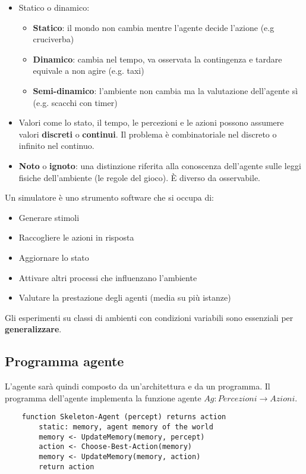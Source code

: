 \begin{itemize}
\begin{itemize}
	\end{itemize}
	\item Statico o dinamico:
	\begin{itemize}
		\item \textbf{Statico}: il mondo non cambia mentre l’agente decide l’azione (e.g cruciverba)
		\item \textbf{Dinamico}: cambia nel tempo, va osservata la contingenza e tardare equivale a non agire (e.g. taxi)
		\item \textbf{Semi-dinamico}: l’ambiente non cambia ma la valutazione dell’agente sì (e.g. scacchi con timer)
	\end{itemize}
	\item Valori come lo stato, il tempo, le percezioni e le azioni possono assumere valori \textbf{discreti} o \textbf{continui}. Il problema è combinatoriale nel discreto o infinito nel continuo.
	\item \textbf{Noto} o \textbf{ignoto}: una distinzione riferita alla conoscenza dell'agente sulle leggi fisiche dell'ambiente (le regole del gioco). È diverso da osservabile.
\end{itemize}

\begin{definition}[Simulatore]
	Un simulatore è uno strumento software che si occupa di:
	\begin{itemize}
		\item Generare stimoli
		\item Raccogliere le azioni in risposta
		\item Aggiornare lo stato
		\item Attivare altri processi che influenzano l'ambiente
		\item Valutare la prestazione degli agenti (media su più istanze)
	\end{itemize}
	Gli esperimenti su classi di ambienti con condizioni variabili sono essenziali per \textbf{generalizzare}.
\end{definition}

\subsection{Programma agente}
L'agente sarà quindi composto da un'architettura e da un programma. Il programma dell'agente implementa la funzione agente $Ag: Percezioni \to Azioni$. 

\begin{lstlisting}
	function Skeleton-Agent (percept) returns action
		static: memory, agent memory of the world
		memory <- UpdateMemory(memory, percept)
		action <- Choose-Best-Action(memory)
		memory <- UpdateMemory(memory, action)
		return action
\end{lstlisting}

